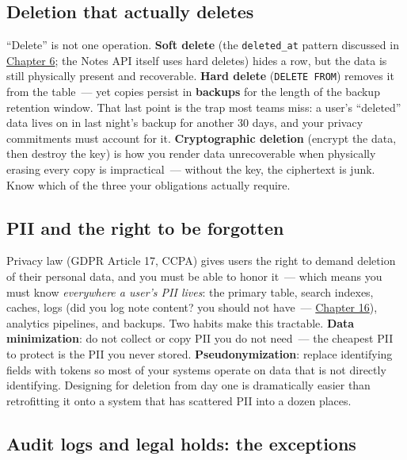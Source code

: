 \subsection*{Deletion that actually deletes}\label{37-reliability:deletion-that-actually-deletes}

``Delete'' is not one operation. \textbf{Soft delete} (the \texttt{deleted\_at} pattern discussed in \hyperref[ch:06-local-dependencies]{Chapter 6}; the Notes API itself uses hard deletes) hides a row, but the data is still physically present and recoverable. \textbf{Hard delete} (\texttt{DELETE\ FROM}) removes it from the table~--- yet copies persist in \textbf{backups} for the length of the backup retention window. That last point is the trap most teams miss: a user's ``deleted'' data lives on in last night's backup for another 30 days, and your privacy commitments must account for it. \textbf{Cryptographic deletion} (encrypt the data, then destroy the key) is how you render data unrecoverable when physically erasing every copy is impractical~--- without the key, the ciphertext is junk. Know which of the three your obligations actually require.

\subsection*{PII and the right to be forgotten}\label{37-reliability:pii-and-the-right-to-be-forgotten}

Privacy law (GDPR Article 17, CCPA) gives users the right to demand deletion of their personal data, and you must be able to honor it~--- which means you must know \emph{everywhere a user's PII lives}: the primary table, search indexes, caches, logs (did you log note content? you should not have~--- \hyperref[ch:16-logging-error-handling]{Chapter 16}), analytics pipelines, and backups. Two habits make this tractable. \textbf{Data minimization}: do not collect or copy PII you do not need~--- the cheapest PII to protect is the PII you never stored. \textbf{Pseudonymization}: replace identifying fields with tokens so most of your systems operate on data that is not directly identifying. Designing for deletion from day one is dramatically easier than retrofitting it onto a system that has scattered PII into a dozen places.

\subsection*{Audit logs and legal holds: the exceptions}\label{37-reliability:audit-logs-and-legal-holds-the-exceptions}

